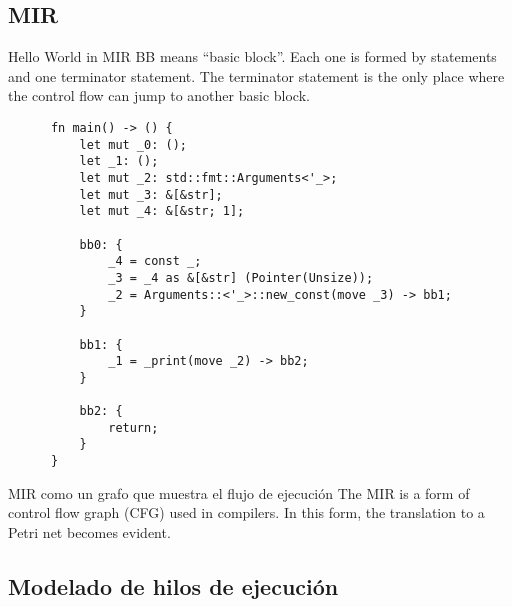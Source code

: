 \documentclass{beamer}
\begin{document}
\subsection{MIR}

\begin{frame}[fragile]{Hello World in MIR}
  \tiny
  BB means ``basic block''. Each one is formed by statements and one terminator statement.
  The terminator statement is the only place where the control flow can jump to another basic block.

  \begin{listing}
    \begin{verbatim}
      fn main() -> () {
          let mut _0: ();                     
          let _1: ();                         
          let mut _2: std::fmt::Arguments<'_>;
          let mut _3: &[&str];                
          let mut _4: &[&str; 1];             
      
          bb0: {
              _4 = const _;                    
              _3 = _4 as &[&str] (Pointer(Unsize));
              _2 = Arguments::<'_>::new_const(move _3) -> bb1;
          }
      
          bb1: {
              _1 = _print(move _2) -> bb2;
          }
      
          bb2: {
              return;
          }
      }      
    \end{verbatim}
  \end{listing}
\end{frame}

\begin{frame}{MIR como un grafo que muestra el flujo de ejecución}
  \scriptsize
  The MIR is a form of control flow graph (CFG) used in compilers.
  In this form, the translation to a Petri net becomes evident.

  \begin{figure}[!htb]
    \centering
    
  \end{figure}
\end{frame}

\subsection{Modelado de hilos de ejecución}
\end{document}
